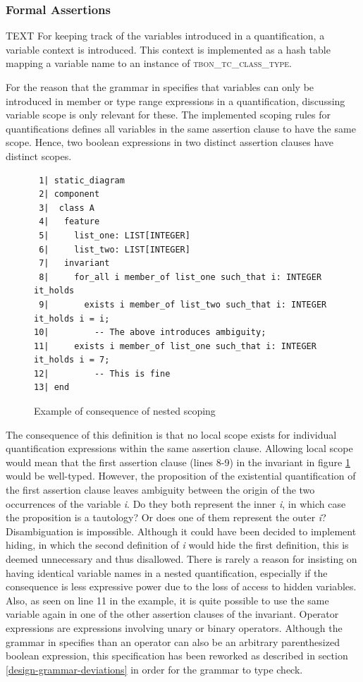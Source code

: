 \subsubsection{Formal Assertions}
\label{implementation-formal-assertions}
TEXT
For keeping track of the variables introduced in a quantification, a variable context is introduced. This context is implemented as a hash table mapping a variable name to an instance of \textsc{tbon\_tc\_class\_type}.

For the reason that the grammar in \cite{walden1995} specifies that variables can only be introduced in member  or type range expressions in a quantification, discussing variable scope is only relevant for these. The implemented scoping rules for quantifications defines all variables in the same assertion clause to have the same scope. Hence, two boolean expressions in two distinct assertion clauses have distinct scopes.
\begin{figure}[H]
{\footnotesize
\begin{verbatim}
 1| static_diagram
 2| component
 3|  class A
 4|   feature
 5|     list_one: LIST[INTEGER]
 6|     list_two: LIST[INTEGER]
 7|   invariant
 8|     for_all i member_of list_one such_that i: INTEGER it_holds 
 9|       exists i member_of list_two such_that i: INTEGER it_holds i = i; 
10|         -- The above introduces ambiguity;
11|     exists i member_of list_one such_that i: INTEGER it_holds i = 7; 
12|         -- This is fine
13| end
\end{verbatim}
}
\caption{Example of consequence of nested scoping}
\label{fig:variable_scoping}
\end{figure}
The consequence of this definition is that no local scope exists for individual quantification expressions within the same assertion clause. Allowing local scope would mean that the first assertion clause (lines 8-9) in the invariant in figure \ref{fig:variable_scoping} would be well-typed. However, the proposition of the existential quantification of the first assertion clause leaves ambiguity between the origin of the two occurrences of the variable \textit{i}. Do they both represent the inner \textit{i}, in which case the proposition is a tautology? Or does one of them represent the outer \textit{i}? Disambiguation is impossible. Although it could have been decided to implement hiding, in which the second definition of \textit{i} would hide the first definition, this is deemed unnecessary and thus disallowed. There is rarely a reason for insisting on having identical variable names in a nested quantification, especially if the consequence is less expressive power due to the loss of access to hidden variables. Also, as seen on line 11 in the example, it is quite possible to use the same variable again in one of the other assertion clauses of the invariant.
Operator expressions are expressions involving unary or binary operators. Although the grammar in \cite{walden1995} specifies than an operator can also be an arbitrary parenthesized boolean expression, this specification has been reworked as described in section \ref{design-grammar-deviations} in order for the grammar to type check. 

